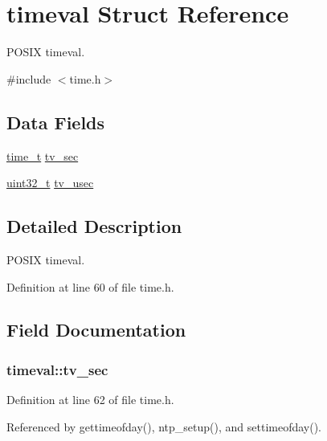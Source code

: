 \hypertarget{structtimeval}{}\section{timeval Struct Reference}
\label{structtimeval}


P\+O\+S\+IX timeval.  




{\ttfamily \#include $<$time.\+h$>$}

\subsection*{Data Fields}
\begin{DoxyCompactItemize}
\item 
\hyperlink{time_8h_a3346b04b0420b32ccf6b706551b70762}{time\+\_\+t} \hyperlink{structtimeval_aef6ddab1064c430758f9f913b7e4a21e}{tv\+\_\+sec}
\item 
\hyperlink{send_8c_a435d1572bf3f880d55459d9805097f62}{uint32\+\_\+t} \hyperlink{structtimeval_a8fd7abf5420981b3ff58bb23df458587}{tv\+\_\+usec}
\end{DoxyCompactItemize}


\subsection{Detailed Description}
P\+O\+S\+IX timeval. 

Definition at line 60 of file time.\+h.



\subsection{Field Documentation}
\subsubsection[{\texorpdfstring{tv\+\_\+sec}{tv_sec}}]{ timeval\+::tv\+\_\+sec}\hypertarget{structtimeval_aef6ddab1064c430758f9f913b7e4a21e}{}\label{structtimeval_aef6ddab1064c430758f9f913b7e4a21e}


Definition at line 62 of file time.\+h.



Referenced by gettimeofday(), ntp\+\_\+setup(), and settimeofday().

